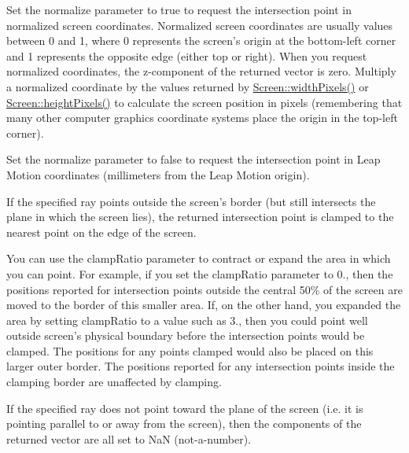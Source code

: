 Set the normalize parameter to true to request the intersection point in normalized screen coordinates. Normalized screen coordinates are usually values between 0 and 1, where 0 represents the screen's origin at the bottom-\/left corner and 1 represents the opposite edge (either top or right). When you request normalized coordinates, the z-\/component of the returned vector is zero. Multiply a normalized coordinate by the values returned by \hyperlink{class_leap_1_1_screen_a183e75cf160db9dfa9653c0f128adac0}{Screen\+::width\+Pixels()} or \hyperlink{class_leap_1_1_screen_a73ec00f33fe7aee01e2a63de06311d79}{Screen\+::height\+Pixels()} to calculate the screen position in pixels (remembering that many other computer graphics coordinate systems place the origin in the top-\/left corner).

Set the normalize parameter to false to request the intersection point in Leap Motion coordinates (millimeters from the Leap Motion origin).

If the specified ray points outside the screen's border (but still intersects the plane in which the screen lies), the returned intersection point is clamped to the nearest point on the edge of the screen.

You can use the clamp\+Ratio parameter to contract or expand the area in which you can point. For example, if you set the clamp\+Ratio parameter to 0., then the positions reported for intersection points outside the central 50\% of the screen are moved to the border of this smaller area. If, on the other hand, you expanded the area by setting clamp\+Ratio to a value such as 3., then you could point well outside screen's physical boundary before the intersection points would be clamped. The positions for any points clamped would also be placed on this larger outer border. The positions reported for any intersection points inside the clamping border are unaffected by clamping.

If the specified ray does not point toward the plane of the screen (i.\+e. it is pointing parallel to or away from the screen), then the components of the returned vector are all set to Na\+N (not-\/a-\/number).


